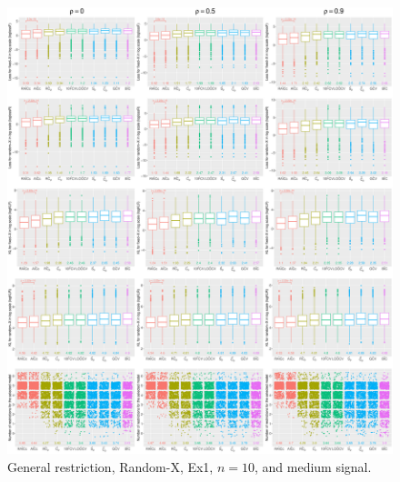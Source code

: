 \clearpage
\begin{figure}[!ht]
\centering
\includegraphics[width=\textwidth]{figures/supplement/randomx/general_restriction/Ex1_n10_msnr.eps}
\caption{General restriction, Random-X, Ex1, $n=10$, and medium signal.}
\end{figure}
\clearpage
